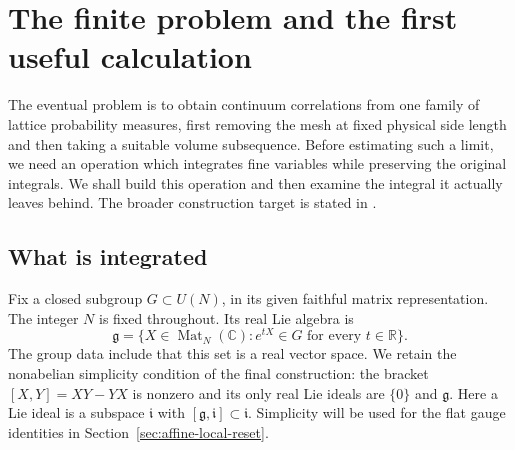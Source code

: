 \documentclass[11pt,reqno]{amsart}
\numberwithin{equation}{section}
\theoremstyle{definition}
\theoremstyle{remark}
\newcommand{\R}{\mathbb R}
\newcommand{\C}{\mathbb C}
\newcommand{\g}{\mathfrak g}
\begin{document}
\begin{abstract}
a physical energy charge per hole seed. The annulus comparison
keeps the negative affine squares with that energy. This proves
a joint Gaussian--Haar packet bound, paying the frozen-link
normalisation and shared incoming occurrences without copying
their variables. Physical Haar variables yield ordered packet and central
derivative estimates. A local affine-Hessian subtraction and
cover compression give sharp incoming regular transport, with
its constant fixed before the block ratio. We identify the first
two ordinary strength coefficients with their retained chart
factors, and compute the classical cubic and quartic jets and
the complete one-loop quadratic jet, including its Haar term.
We match the classical action through degree four by transported
curvatures with path budgets fixed before the block ratio and
bound the resulting local classical remainder.
\end{abstract}
\maketitle
\tableofcontents

\section{The finite problem and the first useful calculation}
\label{sec:finite}

The eventual problem is to obtain continuum correlations from one
family of lattice probability measures, first removing the mesh at
fixed physical side length and then taking a suitable volume
subsequence. Before estimating such a limit, we need an operation
which integrates fine variables while preserving the original
integrals. We shall build this operation and then examine the
integral it actually leaves behind. The broader construction target
is stated in \cite[Theorem~4.1, p.~20]{Main}.

\subsection{What is integrated}

Fix a closed subgroup \(G\subset U(N)\), in its given faithful matrix
representation. The integer \(N\) is fixed throughout. Its real Lie
algebra is
\[
 \g=\{X\in\operatorname{Mat}_N(\C):e^{tX}\in G
                                      \text{ for every }t\in\R\}.
\]
The group data include that this set is a real vector space. We retain
the nonabelian simplicity condition of the final construction: the
bracket \([X,Y]=XY-YX\) is nonzero and its only real Lie ideals are
\(\{0\}\) and \(\g\). Here a Lie ideal is a subspace
\(\mathfrak i\) with \([\g,\mathfrak i]\subset\mathfrak i\).
Simplicity will be used for the flat gauge identities in
Section~\ref{sec:affine-local-reset}.
\end{document}
